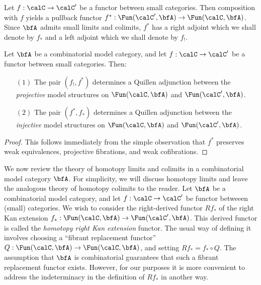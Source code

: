 Let $f: \calC \rightarrow \calC'$ be a functor between small categories. Then
composition with $f$ yields a pullback functor $f^{\ast}:
\Fun(\calC', \bfA) \rightarrow \Fun(\calC, \bfA)$. Since $\bfA$ admits small limits and colimits, $f^{\ast}$ has a right adjoint which we shall denote by $f_{\ast}$ and a left
adjoint which we shall denote by $f_{!}$.

\begin{proposition}\label{colbinn}
Let $\bfA$ be a combinatorial model category,
and let $f: \calC \rightarrow \calC'$ be a functor between small categories.
Then:

\begin{itemize}
\item[$(1)$] The pair $( f_{!}, f^{\ast} )$ determines a Quillen
adjunction between the {\em projective} model structures on
$\Fun(\calC, \bfA)$ and $\Fun(\calC', \bfA)$.

\item[$(2)$] The pair $( f^{\ast}, f_{\ast} )$ determines a
Quillen adjunction between the {\em injective} model structures on
$\Fun(\calC, \bfA)$ and $\Fun(\calC', \bfA)$.
\end{itemize}
\end{proposition}

\begin{proof}
This follows immediately from the simple observation that
$f^{\ast}$ preserves weak equivalences, projective fibrations, and weak
cofibrations.
\end{proof}

We now review the theory of homotopy limits and colimits in a combinatorial model category $\bfA$. For simplicity, we will discuss homotopy limits and leave the analogous theory of homotopy colimits
to the reader. Let $\bfA$ be a combinatorial model category, and let 
$f: \calC \rightarrow \calC'$ be functor betweeen (small) categories. 
We wish to consider the right-derived functor $Rf_{\ast}$ of the right Kan extension $f_{\ast}: \Fun(\calC, \bfA) \rightarrow
\Fun(\calC', \bfA)$. This derived functor is called the {\it homotopy right Kan extension} functor.
The usual way of defining it involves choosing a ``fibrant replacement functor'' $Q: \Fun(\calC, \bfA) \rightarrow \Fun(\calC, \bfA)$, and setting $Rf_{\ast} = f_{\ast} \circ Q$. The assumption that $\bfA$ is combinatorial guarantees that such a fibrant replacement functor exists. However, for our purposes it is more convenient to address the indeterminacy in the definition of $Rf_{\ast}$ in another way.

